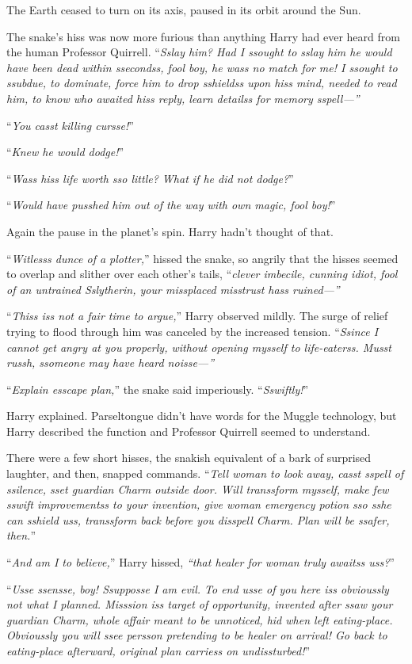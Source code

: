 The Earth ceased to turn on its axis, paused in its orbit around the Sun.

The snake’s hiss was now more furious than anything Harry had ever heard from the human Professor Quirrell. “\emph{Sslay him? Had I ssought to sslay him he would have been dead within ssecondss, fool boy, he wass no match for me! I ssought to ssubdue, to dominate, force him to drop sshieldss upon hiss mind, needed to read him, to know who awaited hiss reply, learn detailss for memory sspell—”}

“\emph{You casst killing cursse!}”

“\emph{Knew he would dodge!}”

“\emph{Wass hiss life worth sso little? What if he did not dodge?}”

“\emph{Would have pusshed him out of the way with own magic, fool boy!}”

Again the pause in the planet’s spin. Harry hadn’t thought of that.

“\emph{Witlesss dunce of a plotter,}” hissed the snake, so angrily that the hisses seemed to overlap and slither over each other’s tails, “\emph{clever imbecile, cunning idiot, fool of an untrained Sslytherin, your missplaced misstrust hass ruined—”}

“\emph{Thiss iss not a fair time to argue,}” Harry observed mildly. The surge of relief trying to flood through him was canceled by the increased tension. “\emph{Ssince I cannot get angry at you properly, without opening mysself to life-eaterss. Musst russh, ssomeone may have heard noisse—”}

“\emph{Explain esscape plan,}” the snake said imperiously. “\emph{Sswiftly!}”

Harry explained. Parseltongue didn’t have words for the Muggle technology, but Harry described the function and Professor Quirrell seemed to understand.

There were a few short hisses, the snakish equivalent of a bark of surprised laughter, and then, snapped commands. “\emph{Tell woman to look away, casst sspell of ssilence, sset guardian Charm outside door. Will transsform mysself, make few sswift improvementss to your invention, give woman emergency potion sso sshe can sshield uss, transsform back before you disspell Charm. Plan will be ssafer, then.}”

“\emph{And am I to believe,}” Harry hissed, \emph{“that healer for woman truly awaitss uss?}”

“\emph{Usse ssensse, boy! Ssupposse I am evil. To end usse of you here iss obvioussly not what I planned. Misssion iss target of opportunity, invented after ssaw your guardian Charm, whole affair meant to be unnoticed, hid when left eating-place. Obvioussly you will ssee persson pretending to be healer on arrival! Go back to eating-place afterward, original plan carriess on undissturbed!}”

